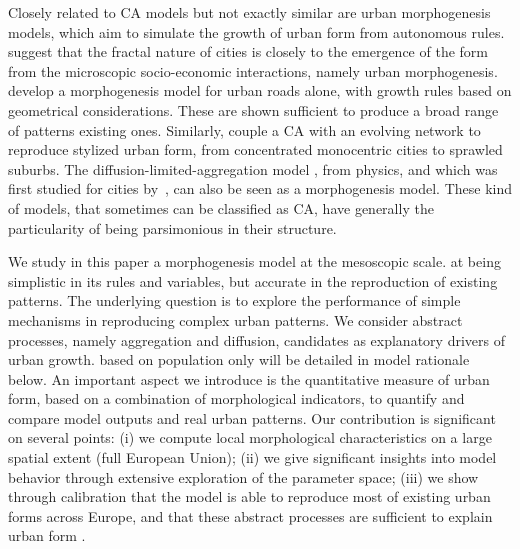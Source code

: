 \documentclass[10pt,letterpaper]{article}
\begin{document}
Closely related to CA models but not exactly similar are urban morphogenesis models, which aim to simulate the growth of urban form from autonomous rules. \cite{frankhauser1998fractal} suggest that the fractal nature of cities is closely  to the emergence of the form from the microscopic socio-economic interactions, namely urban morphogenesis. \cite{courtat2011mathematics} develop a morphogenesis model for urban roads alone, with growth rules based on geometrical considerations. These are shown sufficient to produce a broad range of patterns  existing ones. Similarly, \cite{raimbault2014hybrid} couple a CA with an evolving network to reproduce stylized urban form, from concentrated monocentric cities to sprawled suburbs. The diffusion-limited-aggregation model ,  from physics, and which was first studied for cities by~\cite{batty1991generating}, can also be seen as a morphogenesis model.  These kind of models, that sometimes can be classified as CA, have generally the particularity of being parsimonious in their structure. 


We study in this paper a morphogenesis model at the mesoscopic scale.  at being simplistic in its rules and variables, but  accurate in the reproduction of existing patterns. The underlying question is to explore the performance of simple mechanisms in reproducing complex urban patterns. We consider abstract processes, namely aggregation and diffusion, candidates as  explanatory drivers of urban growth.  based on population only  will be detailed in model rationale below. An important aspect we introduce is the quantitative measure of urban form, based on a combination of morphological indicators, to quantify and compare model outputs and real urban patterns. Our contribution is significant on several points: (i) we compute local morphological characteristics on a large spatial extent (full European Union); (ii) we give significant insights into model behavior through extensive exploration of the parameter space; (iii) we show through calibration that the model is able to reproduce most of existing urban forms across Europe, and that these abstract processes are sufficient to explain urban form .
\end{document}
